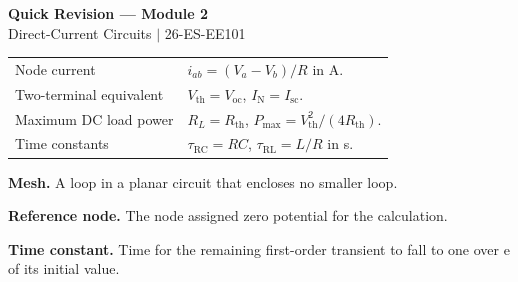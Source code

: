 \documentclass[12pt,a4paper]{article}
\renewcommand{\arraystretch}{1.45}
\begin{document}
\newpage
\begin{center}
  {\large\bfseries\color{myred} Quick Revision --- Module 2}\\[3pt]
  {\small\color{mydark} Direct-Current Circuits $|$ 26-ES-EE101}
\end{center}
\noindent{\color{myred}\rule{\linewidth}{1.2pt}}
\vspace{4pt}

\begin{tcolorbox}[formulabox, title={Key Formulas and Concepts at a Glance}]
\renewcommand{\arraystretch}{1.35}
\begin{tabularx}{\linewidth}{B{4.4cm}Y}
Node current & $i_{ab}=(V_a-V_b)/R$ in A. \\[3pt]
Two-terminal equivalent & $V_{\mathrm{th}}=V_{\mathrm{oc}}$, $I_{\mathrm N}=I_{\mathrm{sc}}$. \\[3pt]
Maximum DC load power & $R_L=R_{\mathrm{th}}$, $P_{\max}=V_{\mathrm{th}}^2/(4R_{\mathrm{th}})$. \\[3pt]
Time constants & $\tau_{\mathrm{RC}}=RC$, $\tau_{\mathrm{RL}}=L/R$ in s. \\[3pt]
\end{tabularx}
\end{tcolorbox}

\begin{tcolorbox}[defbox, title={One-Line Definitions}]
\textbf{Mesh.} A loop in a planar circuit that encloses no smaller loop.

\textbf{Reference node.} The node assigned zero potential for the calculation.

\textbf{Time constant.} Time for the remaining first-order transient to fall to one over e of its initial value.
\end{tcolorbox}
\end{document}
